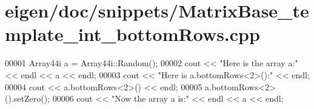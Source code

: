 \hypertarget{eigen_2doc_2snippets_2_matrix_base__template__int__bottom_rows_8cpp_source}{}\section{eigen/doc/snippets/\+Matrix\+Base\+\_\+template\+\_\+int\+\_\+bottom\+Rows.cpp}
\label{eigen_2doc_2snippets_2_matrix_base__template__int__bottom_rows_8cpp_source}

\begin{DoxyCode}
00001 Array44i a = Array44i::Random();
00002 cout << \textcolor{stringliteral}{"Here is the array a:"} << endl << a << endl;
00003 cout << \textcolor{stringliteral}{"Here is a.bottomRows<2>():"} << endl;
00004 cout << a.bottomRows<2>() << endl;
00005 a.bottomRows<2>().setZero();
00006 cout << \textcolor{stringliteral}{"Now the array a is:"} << endl << a << endl;
\end{DoxyCode}

